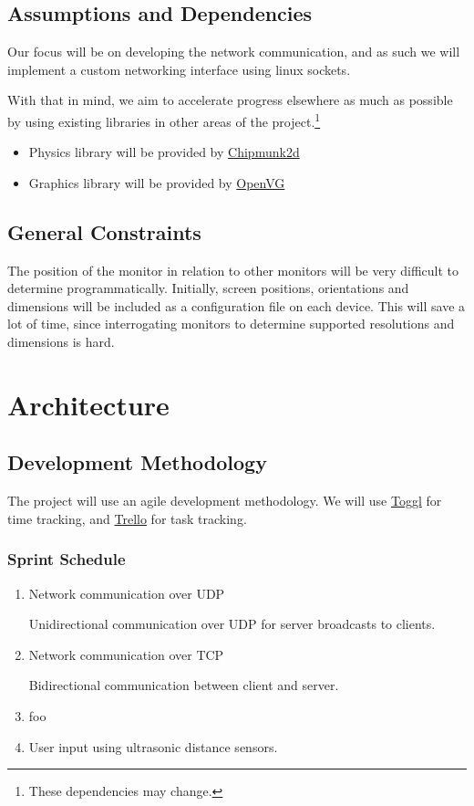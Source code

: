 \documentclass[a4paper]{article}
\begin{document}
\subsection{Assumptions and Dependencies}

Our focus will be on developing the network communication, and as such we will
implement a custom networking interface using linux sockets.

With that in mind, we aim to accelerate progress elsewhere as much as possible
by using existing libraries in other areas of the project.\footnote{These
dependencies may change.}

\begin{itemize}
  \item Physics library will be provided by
    \href{http://chipmunk2d.net/}{Chipmunk2d}
  \item Graphics library will be provided by
    \href{http://www.khronos.org/openvg/}{OpenVG}
\end{itemize}

\subsection{General Constraints}

The position of the monitor in relation to other monitors will be very
difficult to determine programmatically. Initially, screen positions,
orientations and dimensions will be included as a configuration file on each
device. This will save a lot of time, since interrogating monitors to
determine supported resolutions and dimensions is hard.

\section{Architecture}

\subsection{Development Methodology}

The project will use an agile development methodology. We will use
\href{https://www.toggl.com/}{Toggl} for time tracking, and 
\href{https://trello.com/}{Trello} for task tracking.

\subsubsection{Sprint Schedule}

\begin{enumerate}
  \item Network communication over UDP

    Unidirectional communication over UDP for server broadcasts to
    clients.

  \item Network communication over TCP

    Bidirectional communication between client and server.

  \item foo %
  \item User input using ultrasonic distance sensors.
\end{enumerate}
\end{document}
